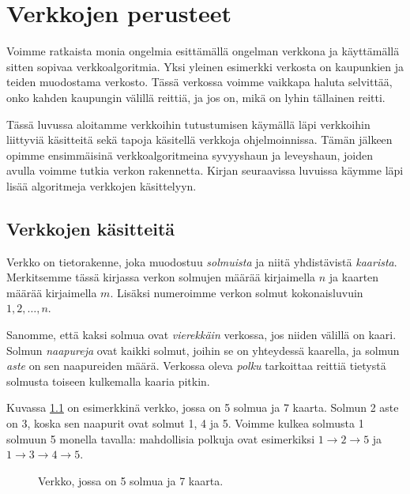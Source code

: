 \chapter{Verkkojen perusteet}

Voimme ratkaista monia ongelmia esittämällä ongelman
verkkona ja käyttä\-mällä sitten sopivaa verkkoalgoritmia.
Yksi yleinen esimerkki verkosta on kaupunkien ja teiden muodostama verkosto.
Tässä verkossa voimme vaikkapa haluta selvittää, onko kahden kaupungin
välillä reittiä, ja jos on, mikä on lyhin tällainen reitti.

Tässä luvussa aloitamme verkkoihin tutustumisen käymällä läpi
verkkoihin liittyviä käsitteitä sekä tapoja käsitellä verkkoja ohjelmoinnissa.
Tämän jälkeen opimme ensimmäisinä verkkoalgoritmeina syvyyshaun ja leveyshaun,
joiden avulla voimme tutkia verkon rakennetta.
Kirjan seuraavissa luvuissa käymme läpi lisää algoritmeja
verkkojen käsittelyyn.

\section{Verkkojen käsitteitä}

Verkko on tietorakenne, joka muodostuu \emph{solmuista} ja
niitä yhdistävistä \emph{kaarista}.
Merkitsemme tässä kirjassa verkon solmujen
määrää kirjaimella $n$ ja kaarten määrää
kirjaimella $m$.
Lisäksi numeroimme verkon solmut kokonaisluvuin
$1,2,\dots,n$.

Sanomme, että kaksi solmua ovat \emph{vierekkäin} verkossa,
jos niiden välillä on kaari.
Solmun \emph{naapureja} ovat kaikki solmut,
joihin se on yhteydessä kaarella,
ja solmun \emph{aste} on sen naapureiden määrä.
Verkossa oleva \emph{polku} tarkoittaa reittiä
tietystä solmusta toiseen kulkemalla kaaria pitkin.

Kuvassa \ref{fig:veresi} on esimerkkinä verkko,
jossa on 5 solmua ja 7 kaarta.
Solmun 2 aste on 3,
koska sen naapurit ovat solmut 1, 4 ja 5.
Voimme kulkea solmusta 1 solmuun 5 monella tavalla:
mahdollisia polkuja ovat esimerkiksi
$1 \rightarrow 2 \rightarrow 5$ ja
$1 \rightarrow 3 \rightarrow 4 \rightarrow 5$.

\begin{figure}
\center
\begin{center}
\end{center}
\caption{Verkko, jossa on 5 solmua ja 7 kaarta.}
\label{fig:veresi}
\end{figure}

